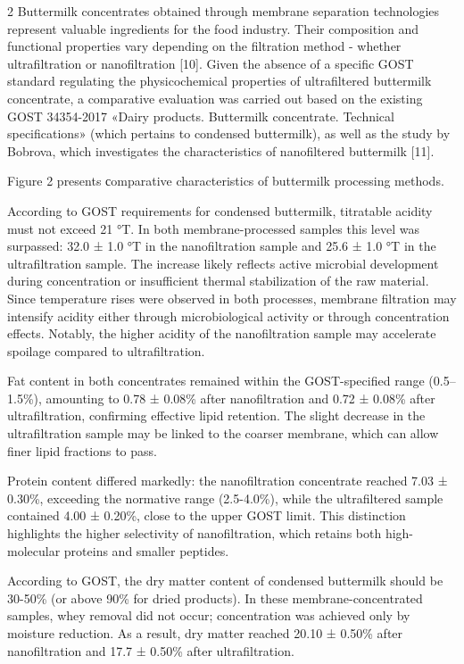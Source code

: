 \begin{multicols}{2}
Buttermilk concentrates obtained through membrane separation
technologies represent valuable ingredients for the food industry. Their
composition and functional properties vary depending on the filtration
method - whether ultrafiltration or nanofiltration {[}10{]}. Given the
absence of a specific GOST standard regulating the physicochemical
properties of ultrafiltered buttermilk concentrate, a comparative
evaluation was carried out based on the existing GOST 34354-2017 «Dairy
products. Buttermilk concentrate. Technical specifications» (which
pertains to condensed buttermilk), as well as the study by Bobrova,
which investigates the characteristics of nanofiltered buttermilk
{[}11{]}.

Figure 2 presents сomparative characteristics of buttermilk processing
methods.

According to GOST requirements for condensed buttermilk, titratable
acidity must not exceed 21 °T. In both membrane-processed samples this
level was surpassed: 32.0 ± 1.0 °T in the nanofiltration sample and 25.6
± 1.0 °T in the ultrafiltration sample. The increase likely reflects
active microbial development during concentration or insufficient
thermal stabilization of the raw material. Since temperature rises were
observed in both processes, membrane filtration may intensify acidity
either through microbiological activity or through concentration
effects. Notably, the higher acidity of the nanofiltration sample may
accelerate spoilage compared to ultrafiltration.

Fat content in both concentrates remained within the GOST-specified
range (0.5--1.5\%), amounting to 0.78 ± 0.08\% after nanofiltration and
0.72 ± 0.08\% after ultrafiltration, confirming effective lipid
retention. The slight decrease in the ultrafiltration sample may be
linked to the coarser membrane, which can allow finer lipid fractions to
pass.

Protein content differed markedly: the nanofiltration concentrate
reached 7.03 ± 0.30\%, exceeding the normative range (2.5-4.0\%), while
the ultrafiltered sample contained 4.00 ± 0.20\%, close to the upper
GOST limit. This distinction highlights the higher selectivity of
nanofiltration, which retains both high-molecular proteins and smaller
peptides.

According to GOST, the dry matter content of condensed buttermilk should
be 30-50\% (or above 90\% for dried products). In these
membrane-concentrated samples, whey removal did not occur; concentration
was achieved only by moisture reduction. As a result, dry matter reached
20.10 ± 0.50\% after nanofiltration and 17.7 ± 0.50\% after
ultrafiltration.


\end{multicols}
